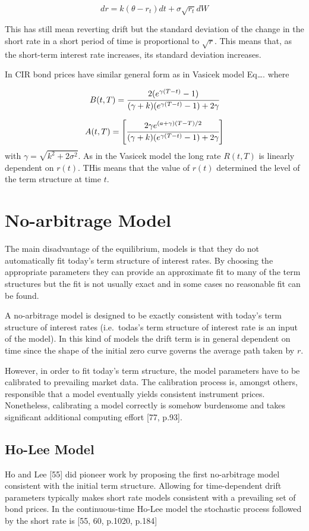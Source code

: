 \[dr = k(\theta - r_t)dt + \sigma\sqrt{r_t}dW\]

This has still mean reverting drift but the standard deviation of the
change in the short rate in a short period of time is proportional to
\(\sqrt{r}\). This means that, as the short-term interest rate
increases, its standard deviation increases.

In CIR bond prices have similar general form as in Vasicek model
Eq\ldots{}. where

\[B(t, T) = \cfrac{2(e^{\gamma(T-t)}-1)}{(\gamma+k)(e^{\gamma(T-t)}-1)+2\gamma}\]

\[A(t, T) = \left[\cfrac{2\gamma e^{(a+\gamma)(T-T)/2}}{(\gamma+k)(e^{\gamma(T-t)}-1)+2\gamma}\right]\]
with \(\gamma = \sqrt {k^2 + 2\sigma^2}\). As in the Vasicek model the
long rate \(R(t, T)\) is linearly dependent on \(r(t)\). THis means that
the value of \(r(t)\) determined the level of the term structure at time
\(t\).

\section{No-arbitrage Model}
\label{no-arbitrage-model}

The main disadvantage of the equilibrium, models is that they do not
automatically fit today's term structure of interest rates. By choosing
the appropriate parameters they can provide an approximate fit to many
of the term structures but the fit is not usually exact and in some
cases no reasonable fit can be found.

A no-arbitrage model is designed to be exactly consistent with today's
term structure of interest rates (i.e.~todas's term structure of
interest rate is an input of the model). In this kind of models the
drift term is in general dependent on time since the shape of the
initial zero curve governs the average path taken by \(r\).

However, in order to fit today’s term structure, the model parameters have
to be calibrated to prevailing market data. The calibration process is,
amongst others, responsible that a model eventually yields consistent
instrument prices. Nonetheless, calibrating a model correctly is somehow
burdensome and takes significant additional computing effort [77, p.93].


\subsection{Ho-Lee Model}\label{ho-lee-model}
Ho and Lee [55] did pioneer work by proposing the first no-arbitrage model consistent with the initial term structure. Allowing for time-dependent drift parameters typically makes short rate models consistent with a prevailing set of bond prices. In the continuous-time Ho-Lee model the stochastic process followed by the short rate is [55, 60, p.1020, p.184]

